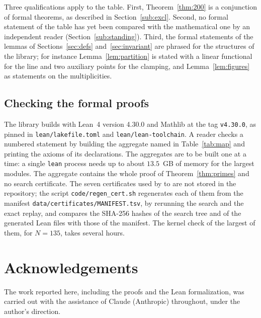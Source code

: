 \documentclass[11pt,reqno]{amsart}
\theoremstyle{plain}
\theoremstyle{definition}
\begin{document}
Three qualifications apply to the table. First, Theorem~\ref{thm:200} is a conjunction of formal theorems,
as described in Section~\ref{sub:excl}. Second, no formal statement of the table has yet been compared with
the mathematical one by an independent reader (Section~\ref{sub:standing}). Third, the formal statements of the lemmas of
Sections~\ref{sec:defs} and~\ref{sec:invariant} are phrased for the structures of the library; for instance
Lemma~\ref{lem:partition} is stated with a linear functional for the line and two auxiliary points for the
clamping, and Lemma~\ref{lem:figures} as statements on the multiplicities.

\subsection{Checking the formal proofs}\label{sub:check}
The library builds with Lean~4 version 4.30.0 and Mathlib at the tag \texttt{v4.30.0}, as pinned in
\texttt{lean/lakefile.toml} and \texttt{lean/lean-toolchain}. A reader checks a numbered statement by building
the aggregate named in Table~\ref{tab:map} and printing the axioms of its declarations. The aggregates are to
be built one at a time: a single \texttt{lean} process needs up to about $13.5$~GB of memory for the largest
modules. The aggregate  contains the whole proof of Theorem~\ref{thm:primes} and no search
certificate. The seven certificates used by  to  are not stored in the
repository; the script \texttt{code/regen\_cert.sh} regenerates each of them from the manifest
\texttt{data/certificates/MANIFEST.tsv}, by rerunning the search and the exact replay, and compares the
SHA-256 hashes of the search tree and of the generated Lean files with those of the manifest. The kernel check
of the largest of them, for $N=135$, takes several hours.

\section*{Acknowledgements}
The work reported here, including the proofs and the Lean formalization, was carried out with the assistance
of Claude (Anthropic) throughout, under the author's direction.
\end{document}
